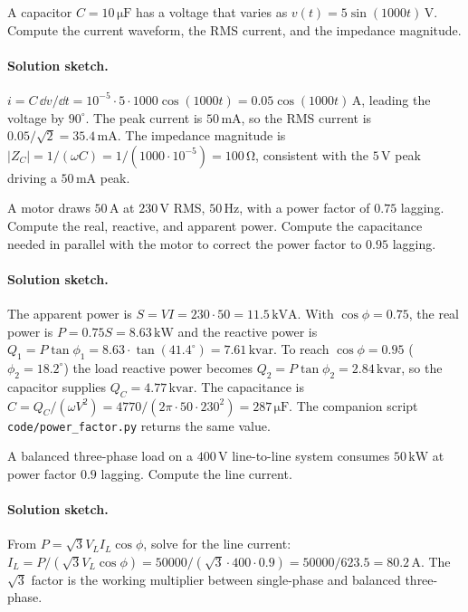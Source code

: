 \begin{exercise}
A capacitor $C = 10\,\si{\micro\farad}$ has a voltage that varies as
$v(t) = 5\sin(1000 t)\,\si{\volt}$. Compute the current waveform, the
RMS current, and the impedance magnitude.
\paragraph{Solution sketch.}
$i = C\,\dd v/\dd t = 10^{-5}\cdot 5\cdot 1000\cos(1000t) =
0.05\cos(1000t)\,\si{\ampere}$, leading the voltage by $90^\circ$. The
peak current is $50\,\si{\milli\ampere}$, so the RMS current is
$0.05/\sqrt{2} = 35.4\,\si{\milli\ampere}$. The impedance magnitude is
$|Z_{C}| = 1/(\omega C) = 1/(1000\cdot 10^{-5}) = 100\,\si{\ohm}$,
consistent with the $5\,\si{\volt}$ peak driving a $50\,\si{\milli
\ampere}$ peak.
\end{exercise}

\begin{exercise}
A motor draws $50\,\si{\ampere}$ at $230\,\si{\volt}$ RMS, $50\,\si{
\hertz}$, with a power factor of $0.75$ lagging. Compute the real,
reactive, and apparent power. Compute the capacitance needed in
parallel with the motor to correct the power factor to $0.95$
lagging.
\paragraph{Solution sketch.}
The apparent power is $S = VI = 230\cdot 50 = 11.5\,\si{\kilo\volt
\ampere}$. With $\cos\phi = 0.75$, the real power is $P = 0.75 S =
8.63\,\si{\kilo\watt}$ and the reactive power is $Q_{1} = P\tan\phi_{1}
= 8.63\cdot\tan(41.4^\circ) = 7.61\,\text{kvar}$. To reach
$\cos\phi = 0.95$ ($\phi_{2} = 18.2^\circ$) the load reactive power
becomes $Q_{2} = P\tan\phi_{2} = 2.84\,\text{kvar}$, so the capacitor
supplies $Q_{C} = 4.77\,\text{kvar}$. The capacitance is $C =
Q_{C}/(\omega V^{2}) = 4770/(2\pi\cdot 50\cdot 230^{2}) = 287\,\si{
\micro\farad}$. The companion script \texttt{code/power\_factor.py}
returns the same value.
\end{exercise}

\begin{exercise}
A balanced three-phase load on a $400\,\si{\volt}$ line-to-line system
consumes $50\,\si{\kilo\watt}$ at power factor $0.9$ lagging. Compute
the line current.
\paragraph{Solution sketch.}
From $P = \sqrt{3}V_{L}I_{L}\cos\phi$, solve for the line current:
$I_{L} = P/(\sqrt{3}V_{L}\cos\phi) = 50000/(\sqrt{3}\cdot 400\cdot 0.9)
= 50000/623.5 = 80.2\,\si{\ampere}$. The $\sqrt{3}$ factor is the
working multiplier between single-phase and balanced three-phase.
\end{exercise}

